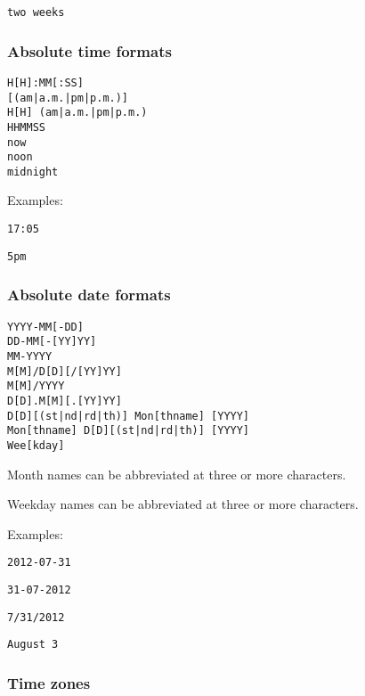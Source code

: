 \documentclass[a4,onecolumn,portrait]{article}
\begin{document}
\begin{verbatim}
two weeks
\end{verbatim}
\subsubsection{Absolute time formats}
\label{sec-8-3-3}

\begin{verbatim}
H[H]:MM[:SS]
[(am|a.m.|pm|p.m.)]
H[H] (am|a.m.|pm|p.m.)
HHMMSS
now
noon
midnight
\end{verbatim}

Examples:

\begin{verbatim}
17:05
\end{verbatim}

\begin{verbatim}
5pm
\end{verbatim}
\subsubsection{Absolute date formats}
\label{sec-8-3-4}

\begin{verbatim}
YYYY-MM[-DD]
DD-MM[-[YY]YY]
MM-YYYY
M[M]/D[D][/[YY]YY]
M[M]/YYYY
D[D].M[M][.[YY]YY]
D[D][(st|nd|rd|th)] Mon[thname] [YYYY]
Mon[thname] D[D][(st|nd|rd|th)] [YYYY]
Wee[kday]
\end{verbatim}

Month names can be abbreviated at three or more characters.

Weekday names can be abbreviated at three or more characters.

Examples:

\begin{verbatim}
2012-07-31
\end{verbatim}

\begin{verbatim}
31-07-2012
\end{verbatim}

\begin{verbatim}
7/31/2012
\end{verbatim}

\begin{verbatim}
August 3
\end{verbatim}
\subsubsection{Time zones}
\label{sec-8-3-5}
\end{document}
